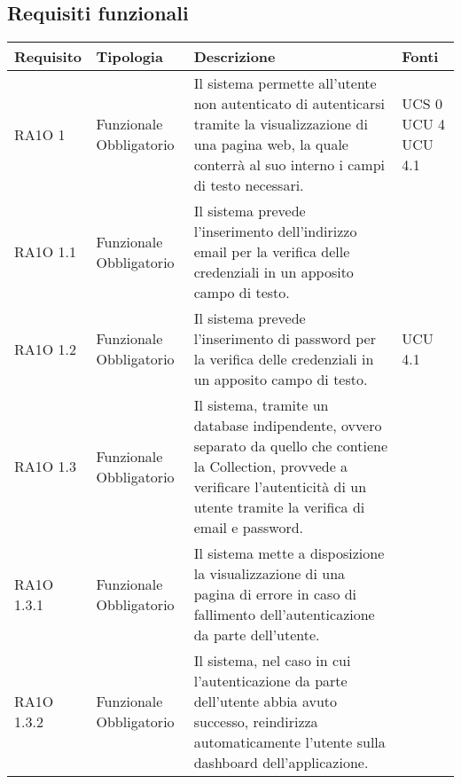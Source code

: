 \subsection{Requisiti funzionali }

			\begin{center}
			\bgroup
			\def\arraystretch{1.8}
			\begin{longtable}{ | l | p{2cm} | p{5cm} | p{1.7cm} |}
		
			\cellcolor[gray]{0.9} \textbf{Requisito} & \cellcolor[gray]{0.9} \textbf{Tipologia} 
			& \cellcolor[gray]{0.9} \textbf{Descrizione} & \cellcolor[gray]{0.9} \textbf{Fonti} \\ \hline
      
				RA1O 1 & Funzionale \newline  Obbligatorio  & Il sistema permette all'utente non autenticato di autenticarsi tramite la visualizzazione di una pagina web, la quale conterrà al suo interno i campi di testo necessari.  &  UCS 0 \newline  UCU 4 \newline  UCU 4.1 \newline  \\ \hline      
				RA1O 1.1 & Funzionale \newline  Obbligatorio  & Il sistema prevede l'inserimento dell'indirizzo email per la verifica delle credenziali in un apposito campo di testo. &  \\ \hline      
				RA1O 1.2 & Funzionale \newline  Obbligatorio  & Il sistema prevede l'inserimento di password per la verifica delle credenziali in un apposito campo di testo. &  UCU 4.1 \newline  \\ \hline      
				RA1O 1.3 & Funzionale \newline  Obbligatorio  & Il sistema, tramite un database indipendente, ovvero separato da quello che contiene la Collection, provvede a verificare l'autenticità  di un utente tramite la verifica di email e password. &  \\ \hline      
				RA1O 1.3.1 & Funzionale \newline  Obbligatorio  & Il sistema mette a disposizione la visualizzazione di una pagina di errore in caso di fallimento dell'autenticazione da parte dell'utente. &  \\ \hline      
				RA1O 1.3.2 & Funzionale \newline  Obbligatorio  & Il sistema, nel caso in cui l'autenticazione da parte dell'utente abbia avuto successo, reindirizza automaticamente l'utente sulla dashboard dell'applicazione. &  \\ \hline      

\end{longtable}
\end{center}

